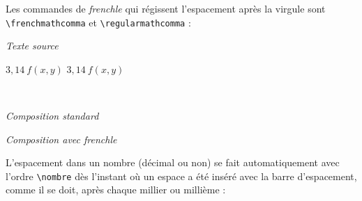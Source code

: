 \documentclass[a4paper,12pt,openright]{article}
\begin{document}
Les commandes de \textit{frenchle} qui régissent l’espacement après la virgule sont\\
\verb|\frenchmathcomma| 
et \verb|\regularmathcomma| :

\begin{center} %
\textit{Texte source}\\[1ex]

\begin{boxedverbatim}
\regularmathcomma $3,14 \ f(x,y)$
\frenchmathcomma  $3,14 \ f(x,y)$
\end{boxedverbatim}
\\[.3ex]
\begin{minipage}{60mm}
\begin{center}
\textit{Composition standard}
\end{center}
\end{minipage}
\begin{minipage}{60mm}
\begin{center}
\textit{Composition avec frenchle}
\end{center}
\end{minipage}
\end{center}
\rule{0pt}{1em}
L’espacement dans un nombre (décimal ou non) se fait automatiquement
avec l’ordre \verb|\nombre| dès l’instant où un espace a été inséré avec la barre d’espacement,
comme il se doit, après chaque millier ou millième :
\end{document}
